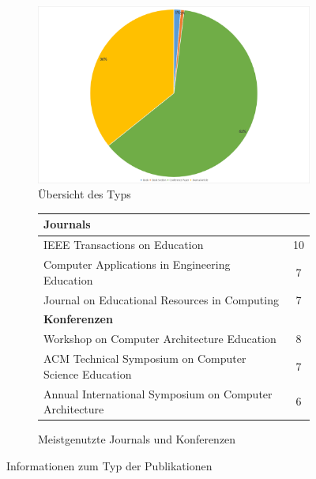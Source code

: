 \begin{figure}[!htbp]
    \centering
    \begin{subfigure}[b]{0.48\textwidth}
        \centering
        \includegraphics[width=1\textwidth]{graphics/2-typ.png}
        \caption{Übersicht des Typs} 
        \label{fig:2-typ}
    \end{subfigure}
    \hfill
    \begin{subfigure}[b]{0.48\textwidth}
        \centering
        \tiny
        \begin{tabularx}{\textwidth}{X c}
            \hline
            \multicolumn{2}{l}{\textbf{Journals}} \\
            \hline
            IEEE Transactions on Education & 10 \\
            Computer Applications in Engineering Education & 7 \\
            Journal on Educational Resources in Computing & 7 \\
            \hline
            \multicolumn{2}{l}{\textbf{Konferenzen}} \\
            \hline
            Workshop on Computer Architecture Education & 8 \\
            ACM Technical Symposium on Computer Science Education & 7 \\
            Annual International Symposium on Computer Architecture & 6 \\
            \hline
        \end{tabularx}
        \caption{Meistgenutzte Journals und Konferenzen}
        \label{tab:2-typ-detail}
    \end{subfigure}
    \caption{Informationen zum Typ der Publikationen}
    \label{fig:2-typ-gesamt}
\end{figure}

